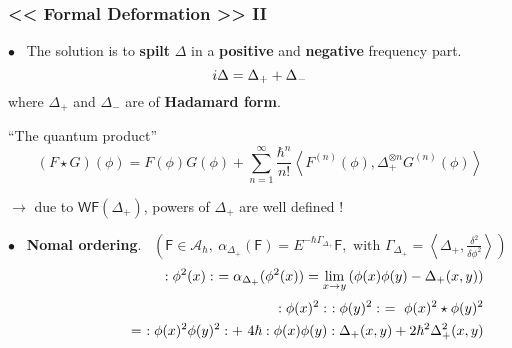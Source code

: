 \documentclass[9pt]{beamer}
\newcommand{\sm}[1]{\left\langle #1 \right\rangle}
\newcommand{\WF}{\mathsf{WF}}
\newcommand{\Acal}{\mathcal{A}}
\newcommand{\Fsf}{\mathsf{F}}
\begin{document}
\begin{frame}
\frametitle{<< Formal Deformation >> II}

\vfill

$\bullet$ \ The solution is to \textbf{spilt} $\Delta$ in a \textbf{positive} and \textbf{negative} frequency part.
\vspace*{-10pt}
\begin{equation*}
i\Delta = \Delta_+ + \Delta_- 
\vspace*{-10pt}
\end{equation*}
\hspace*{8pt} where $\Delta_+$ and $\Delta_-$ are of \textbf{Hadamard form}.

\vfill 


\begin{block}{``The quantum product''}
\vspace*{-16pt}
\begin{equation*}
(F \star G)(\phi) = F(\phi) G(\phi) + \sum_{n=1}^\infty \frac{\hbar^n}{n!} \sm{F^{(n)}(\phi), \Delta_+^{\otimes n} G^{(n)}(\phi)} 
\end{equation*}
\vspace*{-8pt}
\end{block}




$\to$ due to $\WF(\Delta_+)$, powers of $\Delta_+$ are well defined !

\vfill

$\bullet$ \ \textbf{Nomal ordering}. \ 
$\left( \Fsf \in \Acal_\hbar, \ \alpha_{\Delta_+}(\Fsf) = E^{-\hbar \Gamma_{\Delta_+}} \Fsf, \mbox{ with } \Gamma_{\Delta_+} = \sm{\Delta_+,\frac{\delta^2}{\delta\phi^2}} \right)$ 
\begin{eqnarray*}
&& \hspace*{-6pt} :\phi^2(x): \ = \alpha_{\Delta_+}(\phi^2(x)) = \underset{x\to y}{\lim} \left( \phi(x)\phi(y) - \Delta_+(x,y) \right) \\[2pt]
&& \hspace*{-6pt} :\phi(x)^2: \ :\phi(y)^2: \ = \ \phi(x)^2 \star \phi(y)^2 \\
&& \hspace*{58pt} = \ :\phi(x)^2 \phi(y)^2: + \ 4 \hbar :\phi(x) \phi(y):  \Delta_+(x,y) + 2 \hbar^2 \Delta^2_+(x,y)
\end{eqnarray*}

\vfill

\end{frame}

\end{document}
